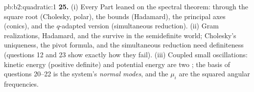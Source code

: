 \begin{solution}{pb:b2:quadratic:1}
\textbf{25.} (i) Every Part leaned on the spectral theorem:
through the square root (Cholesky, polar), the 
bounds (Hadamard), the principal axes (conics), and the
$q$-adapted version (simultaneous reduction). (ii) Gram
realizations, Hadamard, and the  survive in
the semidefinite world; Cholesky's uniqueness, the pivot
formula, and the simultaneous reduction need definiteness
(questions 12 and 23 show exactly how they fail). (iii)
Coupled small oscillations: kinetic energy (positive definite)
and potential energy are two ; the basis of
questions 20--22 is the system's \emph{normal modes}, and the
$\mu_i$ are the squared angular frequencies.
\end{solution}
